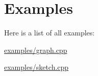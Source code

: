 \section{Examples}
Here is a list of all examples\+:\begin{DoxyCompactItemize}
\item 
\hyperlink{examples_2graph_8cpp-example}{examples/graph.\+cpp}
\item 
\hyperlink{examples_2sketch_8cpp-example}{examples/sketch.\+cpp}
\end{DoxyCompactItemize}
